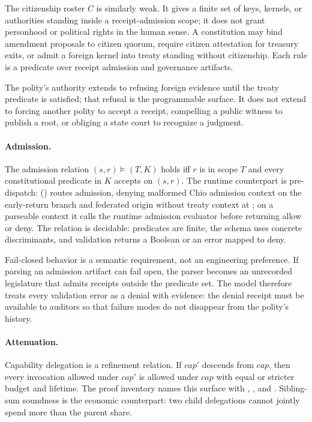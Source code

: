The citizenship roster $C$ is similarly weak. It gives a finite set of keys, kernels, or authorities standing inside a receipt-admission scope; it does not grant personhood or political rights in the human sense. A constitution may bind amendment proposals to citizen quorum, require citizen attestation for treasury exits, or admit a foreign kernel into treaty standing without citizenship. Each rule is a predicate over receipt admission and governance artifacts.

The polity's authority extends to refusing foreign evidence until the treaty predicate is satisfied; that refusal is the programmable surface. It does not extend to forcing another polity to accept a receipt, compelling a public witness to publish a root, or obliging a state court to recognize a judgment.

\paragraph{Admission.}
The admission relation $(s,r)\models(T,K)$ holds iff $r$ is in scope $T$ and every constitutional predicate in $K$ accepts on $(s,r)$. The runtime counterpart is pre-dispatch:  () routes admission, denying malformed Chio admission context on the early-return branch and federated origin without treaty context at ; on a parseable context it calls the runtime admission evaluator before returning allow or deny. The relation is decidable: predicates are finite, the schema uses concrete discriminants, and validation returns a Boolean or an error mapped to deny.

Fail-closed behavior is a semantic requirement, not an engineering preference. If parsing an admission artifact can fail open, the parser becomes an unrecorded legislature that admits receipts outside the predicate set. The model therefore treats every validation error as a denial with evidence: the denial receipt must be available to auditors so that failure modes do not disappear from the polity's history.

\paragraph{Attenuation.}
Capability delegation is a refinement relation. If $cap'$ descends from $cap$, then every invocation allowed under $cap'$ is allowed under $cap$ with equal or stricter budget and lifetime. The proof inventory names this surface with , , and . Sibling-sum soundness is the economic counterpart: two child delegations cannot jointly spend more than the parent share.

